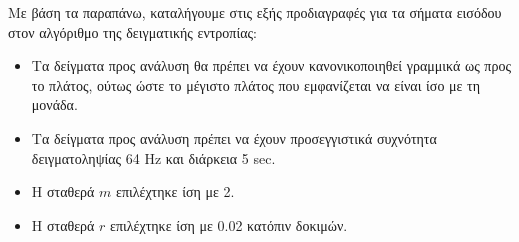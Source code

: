  Με βάση τα παραπάνω, καταλήγουμε στις εξής προδιαγραφές για τα σήματα εισόδου στον αλγόριθμο της δειγματικής εντροπίας:
 \begin{itemize}
     \item Τα δείγματα προς ανάλυση θα πρέπει να έχουν κανονικοποιηθεί γραμμικά ως προς το πλάτος, ούτως ώστε το μέγιστο πλάτος που εμφανίζεται να είναι ίσο με τη μονάδα.
     \item Τα δείγματα προς ανάλυση πρέπει να έχουν προσεγγιστικά συχνότητα δειγματοληψίας 64 Hz και διάρκεια 5 sec.
    \item Η σταθερά $m$ επιλέχτηκε ίση με 2.
    \item Η σταθερά $r$ επιλέχτηκε ίση με 0.02 κατόπιν δοκιμών.
 \end{itemize}
 
 



